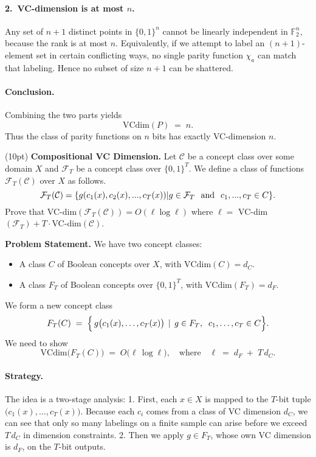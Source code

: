 \documentclass[11pt]{article}
\DeclareMathOperator{\1}{\mathbbm{1}}
\begin{document}
\paragraph{2.~VC-dimension is at most $n$.}
Any set of $n+1$ distinct points in $\{0,1\}^n$ cannot be linearly independent in $\mathbb{F}_2^n$, because the rank is at most $n$.  Equivalently, if we attempt to label an $(n+1)$-element set in certain conflicting ways, no single parity function $\chi_a$ can match that labeling.  Hence no subset of size $n+1$ can be shattered.

\paragraph{Conclusion.}
Combining the two parts yields
\[
\mathrm{VCdim}(P) \;=\; n.
\]
Thus the class of parity functions on $n$ bits has exactly VC-dimension $n$.

\begin{problem} (10pt) \textbf{Compositional VC Dimension.}
Let $\mathcal{C}$ be a concept class over some domain $X$ and $\mathcal{F}_T$ be a concept class over $\{0, 1\}^T$. We define a class of functions $\mathcal{F}_T(\mathcal{C})$ over $X$ as follows. 
\[\mathcal{F}_T(\mathcal{C}) = \{g(c_1(x), c_2(x), . . . , c_T(x)) | g \in \mathcal{F}_T \hspace{0.25cm} \text{\rm and} \hspace{0.25cm} c_1, . . . , c_T \in C\}.\] 
Prove that VC-dim$(\mathcal{F}_T(\mathcal{C})) = O(\ell \log \ell)$ where $\ell =$ VC-dim$(\mathcal{F}_T) + T \cdot $VC-dim$(\mathcal{C})$. 
\end{problem}

\noindent
\textbf{Problem Statement.}
We have two concept classes:
\begin{itemize}
\item A class $C$ of Boolean concepts over $X$, with $\mathrm{VCdim}(C) = d_C$.
\item A class $F_T$ of Boolean concepts over $\{0,1\}^T$, with $\mathrm{VCdim}(F_T) = d_F$.
\end{itemize}
We form a new concept class
\[
F_T(C)\;=\;\Bigl\{\,g\bigl(c_1(x),\dots,c_T(x)\bigr)\,\mid\,g\in F_T,\;\;c_1,\dots,c_T\in C\Bigr\}.
\]
We need to show
\[
\mathrm{VCdim}\bigl(F_T(C)\bigr)\;=\;O\bigl(\ell\,\log \ell\bigr),
\quad\text{where}\quad
\ell \;=\;d_F \;+\;T\,d_C.
\]

\paragraph{Strategy.}
The idea is a two-stage analysis:
1. First, each $x\in X$ is mapped to the $T$-bit tuple $\bigl(c_1(x),\dots,c_T(x)\bigr)$.  Because each $c_i$ comes from a class of VC dimension $d_C$, we can see that only so many labelings on a finite sample can arise before we exceed $T\,d_C$ in dimension constraints.
2. Then we apply $g\in F_T$, whose own VC dimension is $d_F$, on the $T$-bit outputs.
\end{document}
